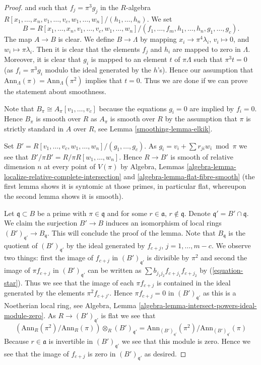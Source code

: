 \begin{proof}
and such that $f_j = \pi^3 g_j$ in the $R$-algebra
$R[x_1, \ldots, x_n, v_1, \ldots, v_c, w_1, \ldots, w_n]/
(h_1, \ldots, h_n)$. We set
$$
B = R[x_1, \ldots, x_n, v_1, \ldots, v_c, w_1, \ldots, w_n]/
(f_1, \ldots, f_m, h_1, \ldots, h_n, g_1, \ldots, g_c).
$$
The map $A \to B$ is clear. We define $B \to \Lambda$ by mapping
$x_i \to \pi^4\lambda_i$, $v_i \mapsto 0$, and $w_i \mapsto \pi \lambda_i$.
Then it is clear that the elements $f_j$ and $h_i$ are mapped to zero
in $\Lambda$. Moreover, it is clear that $g_i$ is mapped to an element
$t$ of $\pi\Lambda$ such that $\pi^3t = 0$ (as $f_i = \pi^3 g_i$ modulo
the ideal generated by the $h$'s). Hence our assumption that
$\text{Ann}_\Lambda(\pi) = \text{Ann}_\Lambda(\pi^2)$ implies that $t = 0$.
Thus we are done if we can prove the statement about smoothness.

\medskip\noindent
Note that $B_\pi \cong A_\pi[v_1, \ldots, v_c]$ because the equations
$g_i = 0$ are implied by $f_i = 0$. Hence $B_\pi$ is smooth over $R$
as $A_\pi$ is smooth over $R$ by the assumption that $\pi$ is strictly
standard in $A$ over $R$, see
Lemma \ref{smoothing-lemma-elkik}.

\medskip\noindent
Set $B' = R[v_1, \ldots, v_c, w_1, \ldots, w_n]/(g_1, \ldots, g_c)$.
As $g_i = v_i + \sum r_{ji}w_i \bmod \pi$ we see that
$B'/\pi B' = R/\pi R[w_1, \ldots, w_n]$. Hence
$R \to B'$ is smooth of relative dimension $n$ at every
point of $V(\pi)$ by
Algebra, Lemmas
\ref{algebra-lemma-localize-relative-complete-intersection} and
\ref{algebra-lemma-flat-fibre-smooth}
(the first lemma shows it is syntomic at those primes, in particular
flat, whereupon the second lemma shows it is smooth).

\medskip\noindent
Let $\mathfrak q \subset B$ be a prime with $\pi \in \mathfrak q$ and
for some $r \in \mathfrak a$, $r \not \in \mathfrak q$.
Denote $\mathfrak q' = B' \cap \mathfrak q$.
We claim the surjection $B' \to B$ induces an isomorphism of local
rings $(B')_{\mathfrak q'} \to B_\mathfrak q$. This will
conclude the proof of the lemma. Note that $B_\mathfrak q$ is the
quotient of $(B')_{\mathfrak q'}$ by the ideal generated by
$f_{c + j}$, $j = 1, \ldots, m - c$. We observe two things:
first the image of $f_{c + j}$ in $(B')_{\mathfrak q'}$ is
divisible by $\pi^2$ and
second the image of $\pi f_{c + j}$ in $(B')_{\mathfrak q'}$
can be written as $\sum b_{j_1 j_2} f_{c + j_1}f_{c + j_2}$ by
(\ref{equation-star}). Thus we see that the image of each $\pi f_{c + j}$
is contained in the ideal generated by the elements $\pi^2 f_{c + j'}$.
Hence $\pi f_{c + j} = 0$ in $(B')_{\mathfrak q'}$ as this is a
Noetherian local ring, see
Algebra, Lemma \ref{algebra-lemma-intersect-powers-ideal-module-zero}.
As $R \to (B')_{\mathfrak q'}$ is flat we see that
$$
\left(\text{Ann}_R(\pi^2)/\text{Ann}_R(\pi)\right)
\otimes_R (B')_{\mathfrak q'}
=
\text{Ann}_{(B')_{\mathfrak q'}}(\pi^2)/\text{Ann}_{(B')_{\mathfrak q'}}(\pi)
$$
Because $r \in \mathfrak a$ is invertible in
$(B')_{\mathfrak q'}$ we see that this module is zero.
Hence we see that the image of $f_{c + j}$ is zero in
$(B')_{\mathfrak q'}$ as desired.
\end{proof}


